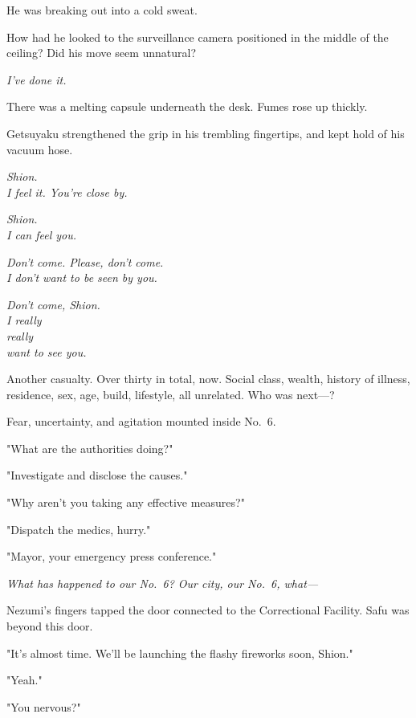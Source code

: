 He was breaking out into a cold sweat.

How had he looked to the surveillance camera positioned in the middle of
the ceiling? Did his move seem unnatural?

\emph{I've done it.}

There was a melting capsule underneath the desk. Fumes rose up thickly.

Getsuyaku strengthened the grip in his trembling fingertips, and kept
hold of his vacuum hose.

\mybreak

\emph{Shion.\\
	I feel it. You're close by.}

\myspace

\emph{Shion.\\
	I can feel you.}

\myspace

\emph{Don't come. Please, don't come.\\
	I don't want to be seen by you.}

\myspace

\emph{Don't come, Shion.\\
	I really\\
	really\\
	want to see you.}

\mybreak

Another casualty. Over thirty in total, now. Social class, wealth,
history of illness, residence, sex, age, build, lifestyle, all
unrelated. Who was next---?

Fear, uncertainty, and agitation mounted inside No.~6.

"What are the authorities doing?"

"Investigate and disclose the causes."

"Why aren't you taking any effective measures?"

"Dispatch the medics, hurry."

"Mayor, your emergency press conference."

\emph{What has happened to our No.~6? Our city, our No.~6, what---}

\mybreak

Nezumi's fingers tapped the door connected to the Correctional Facility.
Safu was beyond this door.

"It's almost time. We'll be launching the flashy fireworks soon, Shion."

"Yeah."

"You nervous?"

